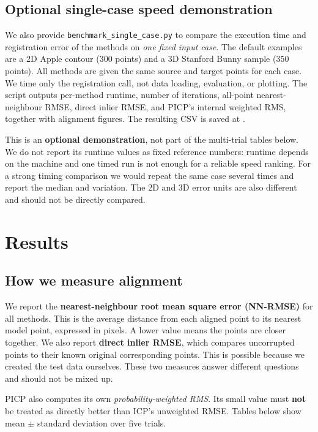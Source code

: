 \documentclass[11pt,a4paper]{article}
\begin{document}
\subsection{Optional single-case speed demonstration}
We also provide \texttt{benchmark\_single\_case.py} to compare the execution time
and registration error of the methods on \emph{one fixed input case}. The default
examples are a 2D Apple contour (300 points) and a 3D Stanford Bunny sample
(350 points). All methods are given the same source and target points for each
case. We time only the registration call, not data loading, evaluation, or
plotting. The script outputs per-method runtime, number of iterations,
all-point nearest-neighbour RMSE, direct inlier RMSE, and PICP's internal
weighted RMS, together with alignment figures. The resulting CSV is saved at
.

This is an \textbf{optional demonstration}, not part of the multi-trial tables
below. We do not report its runtime values as fixed reference numbers: runtime
depends on the machine and one timed run is not enough for a reliable speed
ranking. For a strong timing comparison we would repeat the same case several
times and report the median and variation. The 2D and 3D error units are also
different and should not be directly compared.

\section{Results}

\subsection{How we measure alignment}
We report the \textbf{nearest-neighbour root mean square error (NN-RMSE)} for
all methods. This is the average distance from each aligned point to its
nearest model point, expressed in pixels. A lower value means the points are
closer together. We also report \textbf{direct inlier RMSE}, which compares
uncorrupted points to their known original corresponding points. This is
possible because we created the test data ourselves. These two measures answer
different questions and should not be mixed up.

PICP also computes its own \emph{probability-weighted RMS}. Its small value
must \textbf{not} be treated as directly better than ICP's unweighted RMSE.
Tables below show mean $\pm$ standard deviation over five trials.
\end{document}
